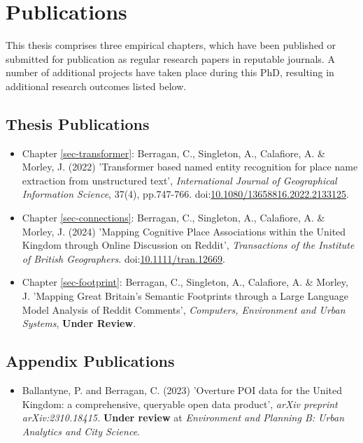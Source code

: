\chapter{Publications}

This thesis comprises three empirical chapters, which have been published or submitted for publication as regular research papers in reputable journals. A number of additional projects have taken place during this PhD, resulting in additional research outcomes listed below.

\section*{Thesis Publications}

\begin{itemize}

  \item Chapter \ref{sec-transformer}: Berragan, C., Singleton, A., Calafiore, A. \& Morley, J. (2022) 'Transformer based named entity recognition for place name extraction from unstructured text', \textit{International Journal of Geographical Information Science}, 37(4), pp.747-766. doi:\href{https://doi.org/10.1080/13658816.2022.2133125}{10.1080/13658816.2022.2133125}.

  \item Chapter \ref{sec-connections}: Berragan, C., Singleton, A., Calafiore, A. \& Morley, J. (2024) 'Mapping Cognitive Place Associations within the United Kingdom through Online Discussion on Reddit', \textit{Transactions of the Institute of British Geographers}. doi:\href{https://doi.org/10.1111/tran.12669}{10.1111/tran.12669}.

  \item Chapter \ref{sec-footprint}: Berragan, C., Singleton, A., Calafiore, A. \& Morley, J. 'Mapping Great Britain's Semantic Footprints through a Large Language Model Analysis of Reddit Comments', \textit{Computers, Environment and Urban Systems}, \textbf{Under Review}.

\end{itemize}

\section*{Appendix Publications}

\begin{itemize}
  \item Ballantyne, P. and Berragan, C. (2023) 'Overture POI data for the United Kingdom: a comprehensive, queryable open data product', \textit{arXiv preprint arXiv:2310.18415.} \textbf{Under review} at \textit{Environment and Planning B: Urban Analytics and City Science}.
\end{itemize}

